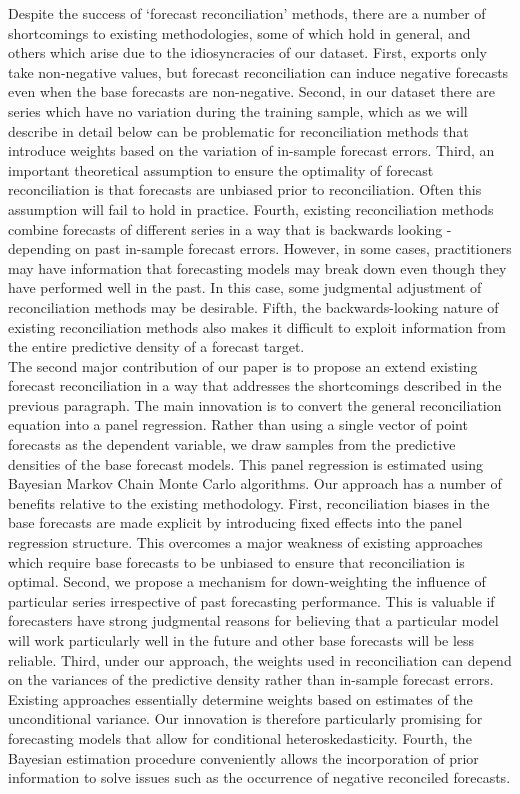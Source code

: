 \documentclass[a4paper,fleqn,11pt]{article}
\begin{document}
Despite the success of `forecast reconciliation' methods, there are a number of shortcomings to existing methodologies, some of which hold in general, and others which arise due to the idiosyncracies of our dataset.  First, exports only take non-negative values, but forecast reconciliation can induce negative forecasts even when the base forecasts are non-negative.  Second, in our dataset there are series which have no variation during the training sample, which as we will describe in detail below can be problematic for reconciliation methods that introduce weights based on the variation of in-sample forecast errors.  Third, an important theoretical assumption to ensure the optimality of forecast reconciliation is that forecasts are unbiased prior to reconciliation.  Often this assumption will fail to hold in practice.  Fourth, existing reconciliation methods combine forecasts of different series in a way that is backwards looking - depending on past in-sample forecast errors.  However, in some cases, practitioners may have information that forecasting models may break down even though they have performed well in the past. In this case, some judgmental adjustment of reconciliation methods may be desirable.  Fifth, the backwards-looking nature of existing reconciliation methods also makes it difficult to exploit information from the entire predictive density of a forecast target.\\

The second major contribution of our paper is to propose an extend existing forecast reconciliation in a way that addresses the shortcomings described in the previous paragraph. The main innovation is to convert the general reconciliation equation into a panel regression. Rather than using a single vector of point forecasts as the dependent variable, we draw samples from the predictive densities of the base forecast models. This panel regression is estimated using Bayesian Markov Chain Monte Carlo algorithms. Our approach has a number of benefits relative to the existing methodology. First, reconciliation biases in the base forecasts are made explicit by introducing fixed effects into the panel regression structure. This overcomes a major weakness of existing approaches which require base forecasts to be unbiased to ensure that reconciliation is optimal. Second, we propose a mechanism for down-weighting the influence of particular series irrespective of past forecasting performance. This is valuable if forecasters have strong judgmental reasons for believing that a particular model will work particularly well in the future and other base forecasts will be less reliable. Third, under our approach, the weights used in reconciliation can depend on the variances of the predictive density rather than in-sample forecast errors. Existing approaches essentially determine weights based on estimates of the unconditional variance. Our innovation is therefore particularly promising for forecasting models that allow for conditional heteroskedasticity. Fourth, the Bayesian estimation procedure conveniently allows the incorporation of prior information to solve issues such as the occurrence of negative reconciled forecasts. 
\end{document}

